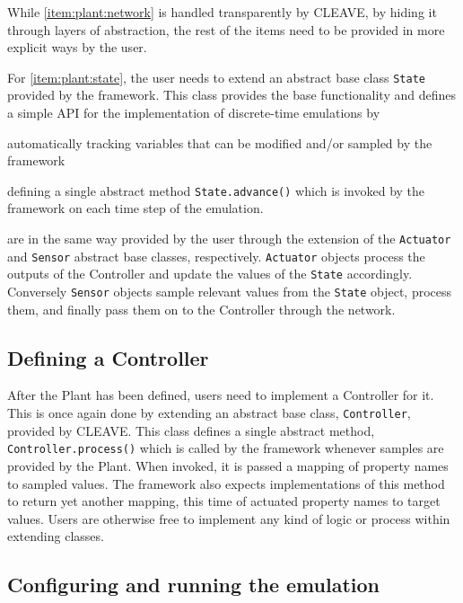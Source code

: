 While \cref{item:plant:network} is handled transparently by CLEAVE, by hiding it through layers of abstraction, the rest of the items need to be provided in more explicit ways by the user.

For \cref{item:plant:state}, the user needs to extend an abstract base class \texttt{State} provided by the framework.
This class provides the base functionality and defines a simple API for the implementation of discrete-time emulations by
\begin{enumerate*}[itemjoin={{; }}, itemjoin*={{; and }}]
    \item automatically tracking variables that can be modified and/or sampled by the framework
    \item defining a single abstract method \texttt{State.advance()} which is invoked by the framework on each time step of the emulation.
\end{enumerate*}

 are in the same way provided by the user through the extension of the \texttt{Actuator} and \texttt{Sensor} abstract base classes, respectively.
\texttt{Actuator} objects process the outputs of the Controller and update the values of the \texttt{State} accordingly.
Conversely \texttt{Sensor} objects sample relevant values from the \texttt{State} object, process them, and finally pass them on to the Controller through the network.

\subsection{Defining a Controller}

After the Plant has been defined, users need to implement a Controller for it.
This is once again done by extending an abstract base class, \texttt{Controller}, provided by CLEAVE.\@
This class defines a single abstract method, \texttt{Controller.process()} which is called by the framework whenever samples are provided by the Plant.
When invoked, it is passed a mapping of property names to sampled values.
The framework also expects implementations of this method to return yet another mapping, this time of actuated property names to target values.
Users are otherwise free to implement any kind of logic or process within extending classes.

\subsection{Configuring and running the emulation}

